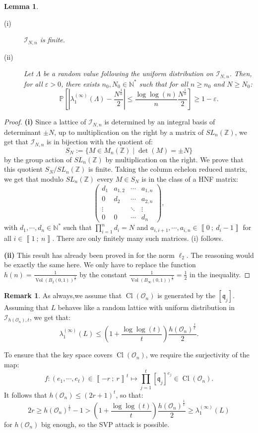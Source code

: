 \documentclass[a4paper,10pt,notitlepage]{report}
\theoremstyle{definition}
\theoremstyle{plain}
\newtheorem{Lemma}[Definition]{Lemma}
\theoremstyle{definition}
\newtheorem{Remark}[Definition]{Remark}
\newcommand{\N}{\mathbb{N}}
\newcommand{\Z}{\mathbb{Z}}
\newcommand{\m}[1]{\mathcal{#1}}
\newcommand{\mO}{\mathcal{O}}
\renewcommand{\i}[2]{\left\llbracket #1~;~#2\right\rrbracket}
\renewcommand{\(}{\left(}
\renewcommand{\)}{\right)}
\renewcommand{\P}{\mathbb{P}}
\newcommand{\mf}[1]{\mathfrak{#1}}
\DeclareMathOperator{\Cl}{Cl}
\DeclareMathOperator{\Vol}{Vol}
\begin{document}
\begin{Lemma}\label{Lemma 22}
\begin{description}
\item[(i)] $\m{I}_{N,n}$ is finite.
\item[(ii)] Let $\Lambda$ be a random value following the uniform distribution on $\m{I}_{N,n}$. Then, for all $\varepsilon>0$, there exists $n_0, N_0\in\N^*$ such that for all $n\geq n_0$ and $N\geq N_0$:
\[\P\left[\left|\lambda_1^{(\infty)}(\Lambda)-\frac{N^{\frac{1}{n}}}{2}\right|\leq \frac{\log\log(n)}{n}\frac{N^{\frac{1}{n}}}{2}\right]\geq 1-\varepsilon.\]
\end{description}
\end{Lemma}

\begin{proof}
\textbf{(i)} Since a lattice of $\m{I}_{N,n}$ is determined by an integral basis of determinant $\pm N$, up to multiplication on the right by a matrix of $SL_n(\Z)$, we get that $\m{I}_{N,n}$ is in bijection with the quotient of:
\[S_N:=\{M\in M_n(\Z)\mid \det(M)=\pm N\}\]
by the group action of $SL_n(\Z)$ by multiplication on the right.  We prove that this quotient $S_N/SL_n(\Z)$ is finite. Taking the column echelon reduced matrix, we get that modulo $SL_n(\Z)$ every $M\in S_N$ is in the class of a HNF matrix:
\[\(\begin{array}{cccc}
d_1 & a_{1,2} & \cdots & a_{1,n}\\
0 & d_2 & \cdots & a_{2,n}\\
\vdots &  & \ddots & \vdots\\
0 & 0 & \cdots & d_n
\end{array}\),\]
with $d_1, \cdots, d_n\in\N^*$ such that $\prod_{i=1}^n d_i=N$ and $a_{i,i+1}, \cdots, a_{i,n}\in\i{0}{d_i-1}$ for all $i\in\i{1}{n}$. There are only finitely many such matrices. (i) follows.

\textbf{(ii)} This result has already been proved in \cite[Theorem 11]{Aono} for the norm $\ell_2$. The reasoning would be exactly the same here. We only have to replace the function $h(n)=\frac{1}{\Vol(B_2(0,1))^{\frac{1}{n}}}$ by the constant $\frac{1}{\Vol(B_\infty(0,1))^{\frac{1}{n}}}=\frac{1}{2}$ in the inequality.
\end{proof}

\begin{Remark}\label{Remark 4}
As always,we assume that $\Cl(\mO_n)$ is generated by the $[\mf{q}_j]$. Assuming that $L$ behaves like a random lattice with uniform distribution in $\m{I}_{h(\mO_n),t}$, we get that:
\[\lambda_1^{(\infty)}(L)\leq \(1+\frac{\log\log(t)}{t}\)\frac{h(\mO_n)^{\frac{1}{t}}}{2}.\] 

To ensure that the key space covers $\Cl(\mO_n)$, we require the surjectivity of the map:
\[f:(e_1,\cdots, e_t)\in\i{-r}{r}^t\longmapsto \prod_{j=1}^t[\mf{q}_j]^{e_j}\in \Cl(\mO_n).\]
It follows that $h(\mO_n)\leq (2r+1)^t$, so that:
\[2r\geq h(\mO_n)^{\frac{1}{t}}-1>\(1+\frac{\log\log(t)}{t}\)\frac{h(\mO_n)^{\frac{1}{t}}}{2}\geq \lambda_1^{(\infty)}(L)\]
for $h(\mO_n)$ big enough, so the SVP attack is possible.
\end{Remark}
\end{document}
